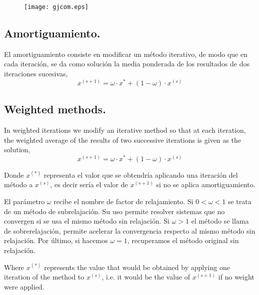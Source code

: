 \begin{figure}[h]
\centering
\texttt{[image: gjcom.eps]}
\label{fig:gjcom}
\end{figure}
\begin{paracol}{2}

\subsection{Amortiguamiento.}  El amortiguamiento consiste en modificar un método iterativo, de modo que en cada iteración, se da como solución la media ponderada de los resultados de dos iteraciones sucesivas,
\begin{equation*}
x^{(s+1)}=\omega \cdot x^{*}+(1-\omega) \cdot x^{(s)}
\end{equation*}

\switchcolumn
\subsection{Weighted methods.}  In weighted iterations we  modify an iterative method so that at each iteration, the weighted average of the results of two successive iterations is given as the solution,
\begin{equation*}
x^{(s+1)}=\omega \cdot x^{*}+(1-\omega) \cdot x^{(s)}
\end{equation*}

\switchcolumn

Donde $x^{(*)}$ representa el valor que se obtendría aplicando una iteración del método a $x^{(s)}$, es decir sería el valor de $x^{(s+1)}$ si no se aplica amortiguamiento.

El parámetro $\omega$ recibe el nombre de factor de relajamiento. Si $0<\omega<1$ se trata de un método de subrelajación. Su uso permite resolver sistemas que no convergen si se usa el mismo método sin relajación. Si $\omega>1$ el método se llama de sobrerelajación, permite acelerar la convergencia respecto al mismo método sin relajación. Por último, si hacemos $\omega=1$, recuperamos el método original sin relajación.

\switchcolumn
Where $x^{(*)}$ represents the value that would be obtained by applying one iteration of the method to $x^{(s)}$, i.e. it would be the value of $x^{(s+1)}$ if no weight were applied.


\end{paracol}
